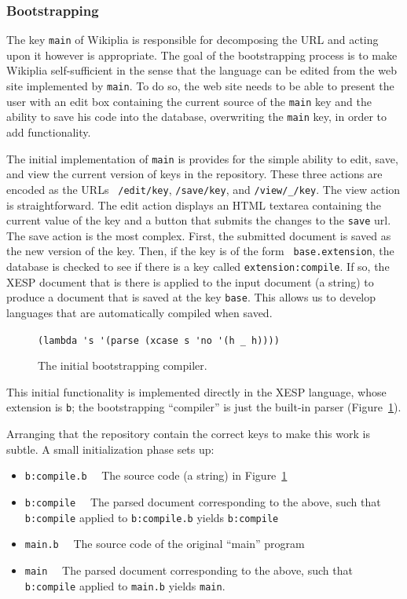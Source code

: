 \documentclass[twocolumn]{article}
\begin{document}
\subsubsection{Bootstrapping}

The key {\tt main} of Wikiplia is responsible for decomposing the URL
and acting upon it however is appropriate. The goal of the
bootstrapping process is to make Wikiplia
self-sufficient in the sense that the language
can be edited from the web site implemented by {\tt main}. To do so, the
web site needs to be able to present the user with an edit box
containing the current source of the {\tt main} key and the ability to
save his code into the database, overwriting the {\tt main} key, in
order to add functionality.

The initial implementation of {\tt main} is provides for the simple
ability to edit, save, and view the current version of keys in the
repository. These three actions are encoded as the URLs {\tt
/edit/key}, {\tt /save/key}, and {\tt /view/\_/key}. The view action
is straightforward. The edit action displays an HTML
textarea containing the current value of the key and a
button that submits the changes to the {\tt save} url. The save action
is the most complex. First, the submitted document is saved as the new
version of the key. Then, if the key is of the form {\tt
base.extension}, the database is checked to see if there is a key
called {\tt extension:compile}. If so, the XESP document that is there
is applied to the input document (a string) to produce a document that
is saved at the key {\tt base}. This allows us to develop languages
that are automatically compiled when saved.

\begin{figure}
\begin{center}
\verb+(lambda 's '(parse (xcase s 'no '(h _ h))))+
\end{center}
\caption{The initial bootstrapping compiler.} \label{fig:b:compile.b}
\end{figure}

This initial functionality is implemented directly in the XESP
language, whose extension is {\tt b}; the bootstrapping ``compiler''
is just the built-in parser (Figure~\ref{fig:b:compile.b}).

Arranging that the repository contain the correct keys to make this
work is subtle. A small initialization phase sets up:
\begin{itemize}
\item {\tt b:compile.b}$\quad$ 
      The source code (a string) in Figure~\ref{fig:b:compile.b}
\item {\tt b:compile}$\quad$ 
      The parsed document corresponding to the above, such that {\tt b:compile} applied to {\tt b:compile.b} yields {\tt b:compile}
\item {\tt main.b}$\quad$ 
      The source code of the original ``main'' program
\item {\tt main}$\quad$
      The parsed document corresponding to the above, such that {\tt b:compile} applied to {\tt main.b} yields {\tt main}.
\end{itemize}
\end{document}
